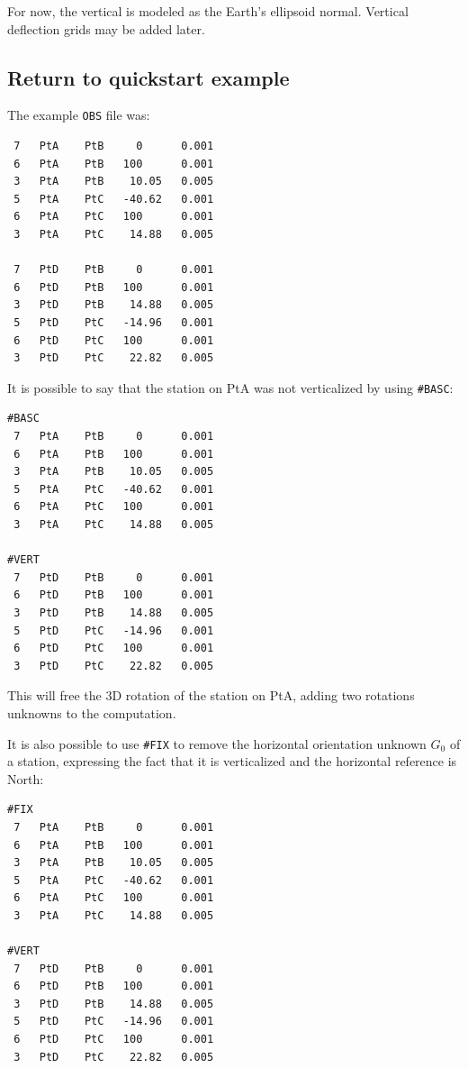For now, the vertical is modeled as the Earth's ellipsoid normal. Vertical deflection grids may be added later.


\subsection{Return to quickstart example}
The example \texttt{OBS} file was:
\begin{verbatim}
 7   PtA    PtB     0      0.001
 6   PtA    PtB   100      0.001
 3   PtA    PtB    10.05   0.005
 5   PtA    PtC   -40.62   0.001
 6   PtA    PtC   100      0.001
 3   PtA    PtC    14.88   0.005

 7   PtD    PtB     0      0.001
 6   PtD    PtB   100      0.001
 3   PtD    PtB    14.88   0.005
 5   PtD    PtC   -14.96   0.001
 6   PtD    PtC   100      0.001
 3   PtD    PtC    22.82   0.005
\end{verbatim}

It is possible to say that the station on PtA was not verticalized by using \texttt{\#BASC}:
\begin{verbatim}
#BASC
 7   PtA    PtB     0      0.001
 6   PtA    PtB   100      0.001
 3   PtA    PtB    10.05   0.005
 5   PtA    PtC   -40.62   0.001
 6   PtA    PtC   100      0.001
 3   PtA    PtC    14.88   0.005

#VERT
 7   PtD    PtB     0      0.001
 6   PtD    PtB   100      0.001
 3   PtD    PtB    14.88   0.005
 5   PtD    PtC   -14.96   0.001
 6   PtD    PtC   100      0.001
 3   PtD    PtC    22.82   0.005
\end{verbatim}

This will free the 3D rotation of the station on PtA, adding two rotations unknowns to the computation.
\newline

It is also possible to use \texttt{\#FIX} to remove the horizontal orientation unknown $G_0$ of a station, expressing the fact that it
is verticalized and the horizontal reference is North:
\begin{verbatim}
#FIX
 7   PtA    PtB     0      0.001
 6   PtA    PtB   100      0.001
 3   PtA    PtB    10.05   0.005
 5   PtA    PtC   -40.62   0.001
 6   PtA    PtC   100      0.001
 3   PtA    PtC    14.88   0.005

#VERT
 7   PtD    PtB     0      0.001
 6   PtD    PtB   100      0.001
 3   PtD    PtB    14.88   0.005
 5   PtD    PtC   -14.96   0.001
 6   PtD    PtC   100      0.001
 3   PtD    PtC    22.82   0.005
\end{verbatim}


